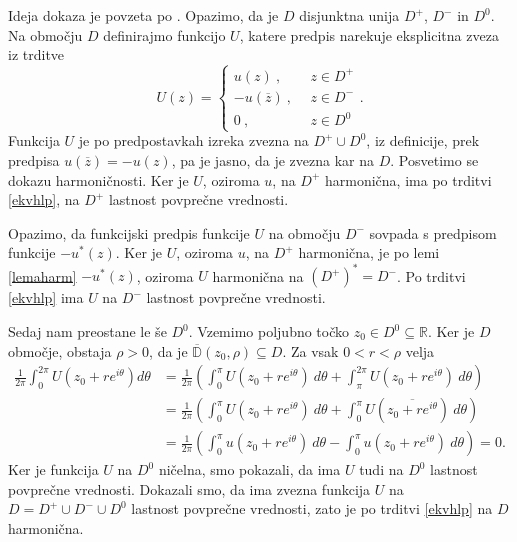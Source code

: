 \documentclass[mat1, tisk]{fmfdelo}
\begin{document}
    \begin{dokaz}
        Ideja dokaza je povzeta po \cite[stran 283]{gamelin}.
        Opazimo, da je $D$ disjunktna unija $D^+$, $D^-$ in $D^0$.
        Na območju $D$ definirajmo funkcijo $U$, katere predpis narekuje eksplicitna zveza iz trditve
        $$
        U(z) = 
        \begin{cases}
            u(z)~,~~&z \in D^{+}\\
            -u(\overline{z})~,~~&z \in D^{-}\\
            0~,~~ &z \in D^0
        \end{cases}
        .
        $$
        Funkcija $U$ je po predpostavkah izreka zvezna na $D^+ \cup D^0$, iz definicije, prek predpisa $u(\overline{z}) = - u(z)$, pa je jasno, da je zvezna kar na $D$. 
        Posvetimo se dokazu harmoničnosti.
        Ker je $U$, oziroma $u$, na $D^+$ harmonična, ima po trditvi \ref{ekvhlp}, na $D^+$ lastnost povprečne vrednosti. 

        Opazimo, da funkcijski predpis funkcije $U$ na območju $D^-$ sovpada s predpisom funkcije $- u^*(z)$. 
        Ker je $U$, oziroma $u$, na $D^+$ harmonična, je po lemi \ref{lemaharm} $-u^*(z)$, oziroma $U$ harmonična na $(D^+)^* = D^-$.
        Po trditvi \ref{ekvhlp} ima $U$ na $D^-$ lastnost povprečne vrednosti. 
        
        Sedaj nam preostane le še $D^0$.
        Vzemimo poljubno točko $z_0 \in D^0 \subseteq \mathbb{R}$. Ker je $D$ območje, obstaja $\rho > 0$, da je $\overline{\mathbb{D}}(z_0, \rho) \subseteq D$. Za vsak $0 < r < \rho$ velja
        \begin{align*}
            \frac{1}{2 \pi} \int_{0}^{2 \pi}{U(z_0 + re^{i \theta}) d\theta} &= \frac{1}{2 \pi} \left(\int_{0}^{\pi}U(z_0 + re^{i \theta})~d\theta + \int_{\pi}^{2\pi} U(z_0 + re^{i \theta})~d\theta\right) \\
            & = \frac{1}{2 \pi} \left(\int_{0}^{\pi}U(z_0 + re^{i \theta})~d\theta + \int_{0}^{\pi}U(\overline{z_0 + re^{i \theta}})~d\theta\right) \\
            &= \frac{1}{2 \pi} \left(\int_{0}^{\pi}u(z_0 + re^{i \theta})~d\theta - \int_{0}^{\pi}u(z_0 + re^{i \theta})~d\theta\right) = 0.
        \end{align*}        
        Ker je funkcija $U$ na $D^0$ ničelna, smo pokazali, da ima $U$ tudi na $D^0$ lastnost povprečne vrednosti. 
        Dokazali smo, da ima zvezna funkcija $U$ na $D = D^+ \cup D^- \cup D^0$ lastnost povprečne vrednosti, zato je po trditvi \ref{ekvhlp} na $D$ harmonična.
    \end{dokaz}
\end{document}
